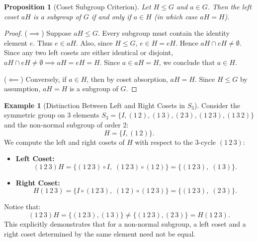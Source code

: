 \documentclass[12pt]{article}
\theoremstyle{definition}
\newtheorem{example}[definition]{Example}
\theoremstyle{plain}
\newtheorem{proposition}[theorem]{Proposition}
\begin{document}
\begin{proposition}[Coset Subgroup Criterion]
Let $H \le G$ and $a \in G$. Then the left coset $aH$ is a subgroup of $G$ if and only if $a \in H$ (in which case $aH = H$).
\end{proposition}
\begin{proof}
($\implies$) Suppose $aH \le G$.
Every subgroup must contain the identity element $e$. Thus $e \in aH$.
Also, since $H \le G$, $e \in H = eH$.
Hence $aH \cap eH \neq \emptyset$.
Since any two left cosets are either identical or disjoint, $aH \cap eH \neq \emptyset \implies aH = eH = H$.
Since $a \in aH = H$, we conclude that $a \in H$.

($\impliedby$) Conversely, if $a \in H$, then by coset absorption, $aH = H$. Since $H \le G$ by assumption, $aH = H$ is a subgroup of $G$.
\end{proof}

\begin{example}[Distinction Between Left and Right Cosets in $S_3$]
Consider the symmetric group on 3 elements $S_3 = \{I, (1\,2), (1\,3), (2\,3), (1\,2\,3), (1\,3\,2)\}$ and the non-normal subgroup of order 2:
\[
H = \{I, (1\,2)\}.
\]
We compute the left and right cosets of $H$ with respect to the 3-cycle $(1\,2\,3)$:
\begin{itemize}
    \item \textbf{Left Coset:}
    \[
    (1\,2\,3)H = \{(1\,2\,3) \circ I, \; (1\,2\,3) \circ (1\,2)\} = \{(1\,2\,3), \; (1\,3)\}.
    \]
    \item \textbf{Right Coset:}
    \[
    H(1\,2\,3) = \{I \circ (1\,2\,3), \; (1\,2) \circ (1\,2\,3)\} = \{(1\,2\,3), \; (2\,3)\}.
    \]
\end{itemize}
Notice that:
\[
(1\,2\,3)H = \{(1\,2\,3), (1\,3)\} \neq \{(1\,2\,3), (2\,3)\} = H(1\,2\,3).
\]
This explicitly demonstrates that for a non-normal subgroup, a left coset and a right coset determined by the same element need not be equal.
\end{example}
\end{document}
